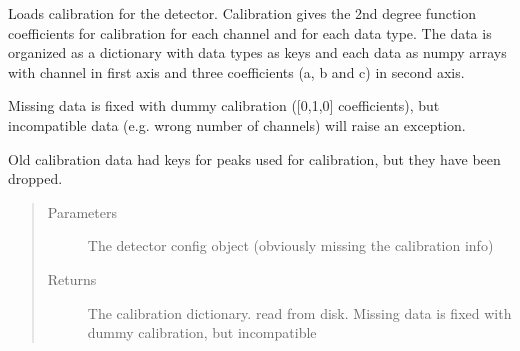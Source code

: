 \documentclass[letterpaper,10pt,english]{sphinxmanual}
\begin{document}
\begin{fulllineitems}
\label{\detokenize{autodocs/data:listmode.data.load_calibration}}
\sphinxAtStartPar
Loads calibration for the detector. Calibration gives the 2nd degree function coefficients for calibration for each
channel and for each data type. The data is organized as a dictionary with data types as keys and each data as
numpy arrays with channel in first axis and three coefficients (a, b and c) in second axis.

\sphinxAtStartPar
Missing data is fixed with dummy calibration ({[}0,1,0{]} coefficients), but incompatible data (e.g. wrong number of
channels) will raise an exception.

\sphinxAtStartPar
Old calibration data had keys for peaks used for calibration, but they have been dropped.
\begin{quote}\begin{description}
\item[{Parameters}] \leavevmode
\sphinxAtStartPar
{} \textendash{} The detector config object (obviously missing the calibration info)

\item[{Returns}] \leavevmode
\sphinxAtStartPar
The calibration dictionary. read from disk. Missing data is fixed with dummy calibration, but incompatible

\end{description}\end{quote}

\end{fulllineitems}

\end{document}
